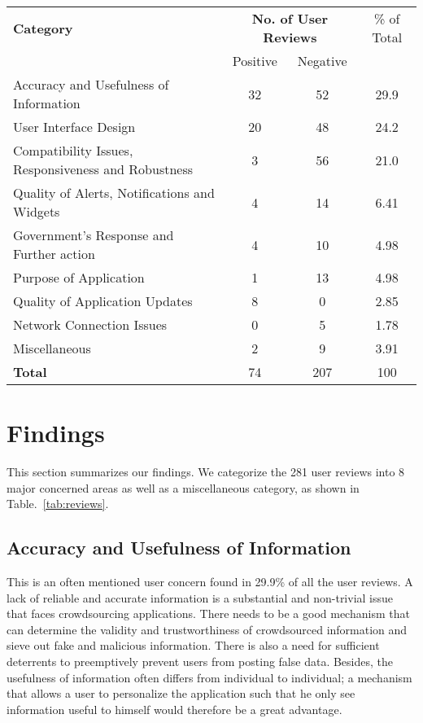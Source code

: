 \documentclass[conference,10pt]{IEEEtran}
\begin{document}
\begin{table*}[tb]
  \caption{Summary of User Reviews by Category}\label{tab:reviews}\vspace{-1mm}
\begin{center}
  \begin{tabular}{ l | c | c | c } \hline
{\bf Category} & \multicolumn{2}{|c|}{\bf No. of User Reviews} & \% of Total \\
 & Positive & Negative & \\ \hline
Accuracy and Usefulness of Information   &  32 & 52 & 29.9 \\
User Interface Design & 20 & 48 & 24.2 \\
Compatibility Issues, Responsiveness and Robustness & 3 & 56 & 21.0 \\
Quality of Alerts, Notifications and Widgets & 4 & 14 & 6.41 \\
Government’s Response and Further action & 4 & 10 & 4.98 \\
Purpose of Application & 1 & 13 & 4.98 \\
Quality of Application Updates & 8 & 0 & 2.85 \\
Network Connection Issues & 0 & 5 & 1.78 \\
Miscellaneous & 2 & 9 & 3.91 \\ \hline
{\bf Total} & 74 & 207 & 100 \\ \hline
  \end{tabular}
\end{center}
\end{table*}


\section{Findings}\label{sec:results}

This section summarizes our findings. We categorize the 281 user reviews into 8 major concerned areas as well as a miscellaneous category, as shown in Table.~\ref{tab:reviews}.

\subsection{Accuracy and Usefulness of Information}
This is an often mentioned user concern found in 29.9\% of all the user reviews. A lack of reliable and accurate information is a substantial and non-trivial issue that faces crowdsourcing applications. There needs to be a good mechanism that can determine the validity and trustworthiness\cite{sew14secon} of crowdsourced information and sieve out fake and malicious information. There is also a need for sufficient deterrents to preemptively prevent users from posting false data. Besides, the usefulness of information often differs from individual to individual; a mechanism that allows a user to personalize the application such that he only see information useful to himself would therefore be a great advantage.
\end{document}
